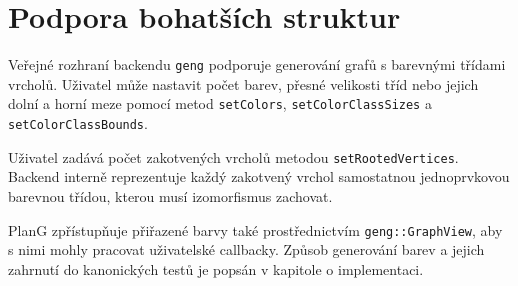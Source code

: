 \section{Podpora bohatších struktur}
\label{sec:richer-structures}

Veřejné rozhraní backendu \texttt{geng} podporuje generování grafů s barevnými
třídami vrcholů. Uživatel může nastavit počet barev, přesné velikosti tříd
nebo jejich dolní a horní meze pomocí metod \texttt{setColors},
\texttt{setColorClassSizes} a \texttt{setColorClassBounds}.

Uživatel zadává počet zakotvených vrcholů metodou
\texttt{setRootedVertices}. Backend interně reprezentuje každý zakotvený
vrchol samostatnou jednoprvkovou barevnou třídou, kterou musí izomorfismus
zachovat.

PlanG zpřístupňuje přiřazené barvy také prostřednictvím
\texttt{geng::GraphView}, aby s nimi mohly pracovat uživatelské callbacky.
Způsob generování barev a jejich zahrnutí do kanonických testů je popsán v
kapitole o implementaci.
